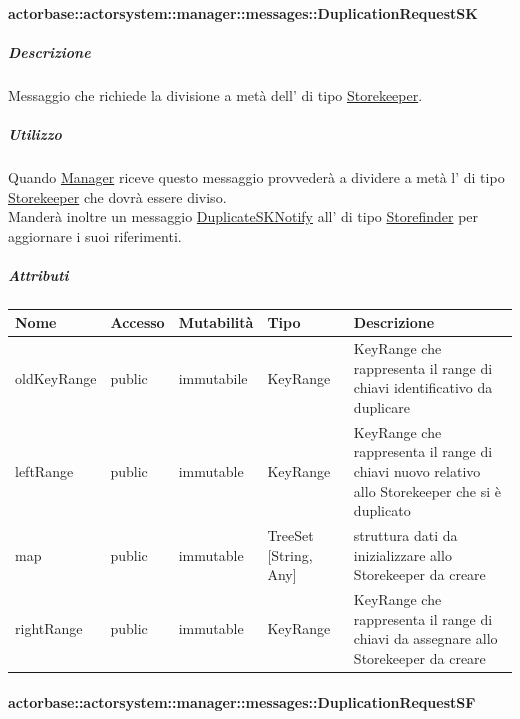 \documentclass{scalatekids-article}
\begin{document}
\paragraph{actorbase::actorsystem::manager::messages::DuplicationRequestSK}
\label{sec:actorbase::actorsystem::manager::messages::DuplicationRequestSK}

\subparagraph{Descrizione}

Messaggio che richiede la divisione a metà dell' di tipo
\hyperref[sec:actorbase::actorsystem::storekeeper::Storekeeper]{Storekeeper}.

\subparagraph{Utilizzo}

Quando \hyperref[sec:actorbase::actorsystem::manager::Manager]{Manager}
riceve questo messaggio provvederà a dividere a metà l' di tipo
\hyperref[sec:actorbase::actorsystem::storekeeper::Storekeeper]{Storekeeper}
che dovrà essere diviso.\\Manderà inoltre un messaggio \hyperref[sec:actorbase::actorsystem::storefinder::messages::DuplicateSKNotify]{DuplicateSKNotify} all' di tipo
\hyperref[sec:actorbase::actorsystem::storefinder::Storefinder]{Storefinder}
per aggiornare i suoi riferimenti.

\subparagraph{Attributi}
\begin{tabular}{| p{3cm} | p{1.5cm} | p{2cm} | p{2cm} | p{8.5cm} |}
  \hline
  Nome & Accesso & Mutabilità & Tipo & Descrizione\\
  \hline
  oldKeyRange & public & immutabile & KeyRange & KeyRange che rappresenta il range di chiavi identificativo da duplicare\\
  \hline
  leftRange & public & immutable & KeyRange & KeyRange che rappresenta il range di chiavi nuovo relativo allo Storekeeper che si è duplicato\\
  \hline
  map & public & immutable & TreeSet [String, Any] & struttura dati da inizializzare allo Storekeeper da creare\\
  \hline
  rightRange & public & immutable & KeyRange & KeyRange che rappresenta il range di chiavi da assegnare allo Storekeeper da creare\\
  \hline
\end{tabular}

\paragraph{actorbase::actorsystem::manager::messages::DuplicationRequestSF}
\label{sec:actorbase::actorsystem::manager::messages::DuplicationRequestSF}
\end{document}
